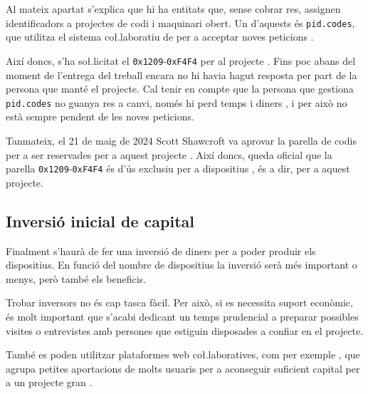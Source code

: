 Al mateix apartat s'explica que hi ha entitats que, sense cobrar res, assignen
identificadors a projectes de codi i maquinari obert. Un d'aquests és
\texttt{pid.codes}, que utilitza el sistema co\l.laboratiu de  per a
acceptar noves peticions \cite{PidCodes}.

Així doncs, s'ha so\l.licitat el  \texttt{0x1209}-\texttt{0xF4F4}
per al projecte . Fins poc abans del moment de l'entrega del
treball encara no hi havia hagut resposta per part de la persona que manté el
projecte. Cal tenir en compte que
la persona que gestiona \texttt{pid.codes} no guanya res a canvi, només hi perd
temps i diners \cite{PidCodesFaq}, i per això no està sempre pendent de
les noves peticions.

Tanmateix, el 21 de maig de 2024 Scott Shawcroft va aprovar la parella de codis
 per a ser reservades per a aquest projecte \cite{PidCodesPR}.
Així doncs, queda oficial que la parella \texttt{0x1209}-\texttt{0xF4F4} és
d'ús exclusiu per a dispositius , és a dir, per a aquest
projecte.

\subsection{Inversió inicial de capital}

Finalment s'haurà de fer una inversió de diners per a poder produir els
dispositius. En funció del nombre de dispositius la inversió serà més important
o menys, però també els beneficis.

Trobar inversors no és cap tasca fàcil. Per això, si es necessita suport
econòmic, és molt important que s'acabi dedicant un temps prudencial a preparar
possibles visites o entrevistes amb persones que estiguin disposades a confiar
en el projecte.

També es poden utilitzar plataformes web co\l.laboratives, com per exemple
, que agrupa petites aportacions de molts usuaris per a
aconseguir suficient capital per a un projecte gran \cite{Kickstarter}.
